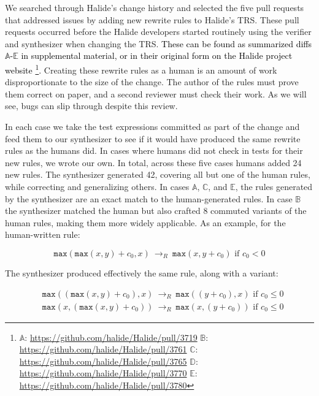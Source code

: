 \documentclass[acmsmall,review]{acmart}\settopmatter{printfolios=true,printccs=false,printacmref=false}
\newcommand{\modified}[1]{\textcolor{black}{{#1}}}
\newcommand{\hmax}[0]{\texttt{max}}
\newcommand{\rewrites}[0]{\:\rightarrow_{R}\:}
\newcommand{\pred}[0]{\textrm{ if }}
\begin{document}


We searched through Halide’s change history and selected the five pull requests that addressed issues by adding new rewrite rules to Halide’s TRS. These pull requests occurred before the Halide developers started routinely using the verifier and synthesizer when changing the TRS. \modified{These can be found as summarized diffs $\mathbb{A}$-$\mathbb{E}$ in supplemental material, or in their original form on the Halide project website
\footnote{
$\mathbb{A}$: \url{https://github.com/halide/Halide/pull/3719}
$\mathbb{B}$: \url{https://github.com/halide/Halide/pull/3761}
$\mathbb{C}$: \url{https://github.com/halide/Halide/pull/3765}
$\mathbb{D}$: \url{https://github.com/halide/Halide/pull/3770}
$\mathbb{E}$: \url{https://github.com/halide/Halide/pull/3780}
}.}
Creating these rewrite rules as a human is an amount of work disproportionate to the size of the change. The author of the rules must prove them correct on paper, and a second reviewer must check their work. As we will see, bugs can slip through despite this review. 

In each case we take the test expressions committed as part of the change and feed them to our synthesizer to see if it would have produced the same rewrite rules as the humans did. In cases where humans did not check in tests for their new rules, we wrote our own. In total, across these five cases humans added 24 new rules. The synthesizer generated 42, covering all but one of the human rules, while correcting and generalizing others. In cases $\mathbb{A}$, $\mathbb{C}$, and $\mathbb{E}$, the rules generated by the synthesizer are an exact match to the human-generated rules. In case $\mathbb{B}$ the synthesizer matched the human but also crafted 8 commuted variants of the human rules, making them more widely applicable. As an example, for the human-written rule:

\[
\hmax(\hmax(x, y) + c_0, x) \rewrites \hmax(x, y + c_0) \pred c_0 < 0
\]

The synthesizer produced effectively the same rule, along with a variant:

\begin{align*}
& \hmax((\hmax(x, y) + c_0), x) \rewrites \hmax((y + c_0), x) \pred c_0 \leq 0 \\
& \hmax(x, (\hmax(x, y) + c_0)) \rewrites \hmax(x, (y + c_0)) \pred c_0 \leq 0
\end{align*}
\end{document}
